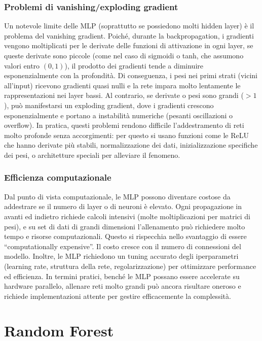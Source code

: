 \documentclass[a4paper,12pt]{report}
\begin{document}
	\subsection{Problemi di vanishing/exploding gradient}
	Un notevole limite delle MLP (soprattutto se possiedono molti hidden layer) è il problema del vanishing gradient. Poiché, durante la backpropagation, i gradienti vengono moltiplicati per le derivate delle funzioni di attivazione in ogni layer, se queste derivate sono piccole (come nel caso di sigmoidi o tanh, che assumono valori entro $(0,1)$), il prodotto dei gradienti tende a diminuire esponenzialmente con la profondità. Di conseguenza, i pesi nei primi strati (vicini all'input) ricevono gradienti quasi nulli e la rete impara molto lentamente le rappresentazioni nei layer bassi.
	Al contrario, se derivate o pesi sono grandi ($>1$), può manifestarsi un exploding gradient, dove i gradienti crescono esponenzialmente e portano a instabilità numeriche (pesanti oscillazioni o overflow).
	In pratica, questi problemi rendono difficile l'addestramento di reti molto profonde senza accorgimenti: per questo si usano funzioni come le ReLU che hanno derivate più stabili, normalizzazione dei dati, inizializzazione specifiche dei pesi, o architetture speciali per alleviare il fenomeno.
	
	\subsection{Efficienza computazionale}
	Dal punto di vista computazionale, le MLP possono diventare costose da addestrare se il numero di layer o di neuroni è elevato. Ogni propagazione in avanti ed indietro richiede calcoli intensivi (molte moltiplicazioni per matrici di pesi), e su set di dati di grandi dimensioni l'allenamento può richiedere molto tempo e risorse computazionali. Questo si rispecchia nello svantaggio di essere ``computationally expensive''. Il costo cresce con il numero di connessioni del modello. Inoltre, le MLP richiedono un tuning accurato degli iperparametri (learning rate, struttura della rete, regolarizzazione) per ottimizzare performance ed efficienza. In termini pratici, benché le MLP possano essere accelerate su hardware parallelo, allenare reti molto grandi può ancora risultare oneroso e richiede implementazioni attente per gestire efficacemente la complessità.
	
	\chapter{Random Forest}
	
\end{document}
